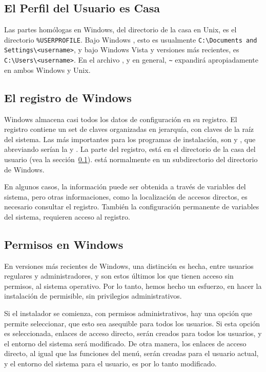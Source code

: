\documentclass{article}
\begin{document}
\subsection{El Perfil del Usuario es Casa}
\label{sec:winhome}

Las partes homólogas en Windows, del directorio de la casa en Unix, es el
directorio \verb|%USERPROFILE|. Bajo Windows , esto es usualmente
\verb|C:\Documents and Settings\<username>|, y bajo Windows Vista y
versiones más recientes, es \verb|C:\Users\<username>|. En el archivo
, y \KPS{} en general, \verb|~| expandirá
apropiadamente en ambos Windows y Unix. 

\subsection{El registro de Windows}
\label{sec:registry}

Windows almacena casi todos los datos de configuración en su registro. El
registro contiene un set de claves organizadas en jerarquía, con claves de
la raíz del sistema. Las más importantes para los programas de
instalación, son  y , que
abreviando serían la  y . La parte  del
registro, está en el directorio de la casa del usuario (vea la
sección~\ref{sec:winhome}).  está normalmente en un
subdirectorio del directorio de Windows.

En algunos casos, la información puede ser obtenida a través de variables
del sistema, pero otras informaciones, como la localización de accesos
directos, es necesario consultar el registro. También la configuración
permanente de variables del sistema, requieren acceso al registro.

\subsection{Permisos en Windows}
\label{sec:winpermissions}

En versiones más recientes de Windows, una distinción es hecha, entre
usuarios regulares y administradores, y son estos últimos los que tienen
acceso sin permisos, al sistema operativo. Por lo tanto, hemos hecho un
esfuerzo, en hacer la instalación de \TL{} permisible, sin privilegios
administrativos. 

Si el instalador se comienza, con permisos administrativos, hay una
opción que permite seleccionar, que esto sea asequible para todos los
usuarios. Si esta opción es seleccionada, enlaces de acceso directo,
serán creados para todos los usuarios, y el entorno del sistema será
modificado. De otra manera, los enlaces de acceso directo, al igual
que las funciones del menú, serán creadas para el usuario actual, y el
entorno del sistema para el usuario, es por lo tanto modificado. 
\end{document}
